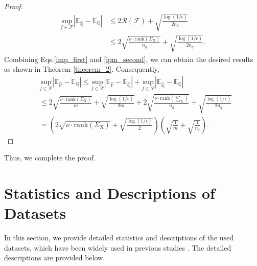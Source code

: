 \begin{proof}
\begin{equation}
\label{ipm_second}
\begin{aligned}
    \underset{f\in\mathcal{F}}{\text{sup}} \left| \mathbb E_{\hat{\mathbb Q}} - \mathbb E_{\mathbb Q} \right| &\leq 2 \mathcal{R}(\mathcal{F})+\sqrt{\frac{\log(1/\epsilon)}{2n_q}} \\
    &\leq 2\sqrt{\frac{\nu\cdot\textrm{rank}(\Sigma_\mathrm{X})}{n_q}}+\sqrt{\frac{\log(1/\epsilon)}{2n_q}}.
\end{aligned}
\end{equation}
Combining Eqs.\ref{imp_first} and \ref{ipm_second}, we can obtain the desired results as shown in Theorem \ref{theorem_2}. Consequently,
\begin{equation}
    \begin{aligned}
        &\underset{f\in\mathcal{F}}{\text{sup}}|\mathbb{E}_{\hat{\mathbb P} }-\mathbb E_{\mathbb Q}| \leq \underset{f\in\mathcal{F}}{\text{sup}}\left| \mathbb{E}_{\hat{\mathbb P} } - \mathbb E_{\hat{\mathbb Q}} \right| + \underset{f\in\mathcal{F}}{\text{sup}} \left| \mathbb E_{\hat{\mathbb Q}} - \mathbb E_{\mathbb Q} \right|
        \\ &\leq 2\sqrt{\frac{\nu\cdot\textrm{rank}(\Sigma_\mathrm{X})}{m}}+\sqrt{\frac{\log(1/\epsilon)}{2m}} + 2\sqrt{\frac{\nu\cdot\textrm{rank}(\sum_\mathrm{X})}{n_q}}+\sqrt{\frac{\log(1/\epsilon)}{2n_q}} \\
        &=\left(2\sqrt{\nu\cdot\text{rank}(\Sigma_{\mathrm{X}})} + \sqrt{\frac{\log(1/\epsilon)}{2}} \right) \left( \sqrt{\frac{1}{m}} + \sqrt{\frac{1}{n_q}} \right).
    \end{aligned}
\end{equation}
\end{proof}
Thus, we complete the proof. %


\section{Statistics and Descriptions of Datasets}
\label{dataset_description}
In this section, we provide detailed statistics and descriptions of the used datasets, which have been widely used in previous studies \cite{ding2020graph, liu2022few, wang2022task}. The detailed descriptions are provided below.

